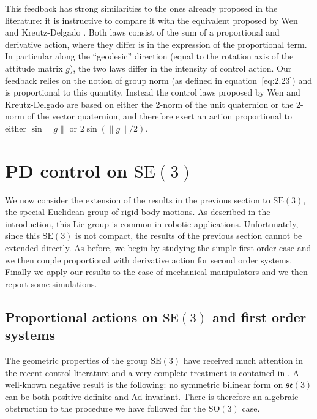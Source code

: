 \documentclass[11pt]{article}
\newcommand{\SO}{\mathrm{SO}}
\newcommand{\SE}{\mathrm{SE}}
\newcommand{\se}{\mathfrak{se}}
\begin{document}
This feedback has strong similarities to the ones already proposed in the literature: it is instructive to compare it with the equivalent proposed by Wen and Kreutz-Delgado \cite{34}. Both laws consist of the sum of a proportional and derivative action, where they differ is in the expression of the proportional term. In particular along the ``geodesic'' direction (equal to the rotation axis of the attitude matrix $g$), the two laws differ in the intensity of control action. Our feedback relies on the notion of group norm (as defined in equation~\eqref{eq:2.23}) and is proportional to this quantity. Instead the control laws proposed by Wen and Kreutz-Delgado are based on either the 2-norm of the unit quaternion or the 2-norm of the vector quaternion, and therefore exert an action proportional to either $\sin\|g\|$ or $2\sin(\|g\|/2)$.

\section{PD control on $\SE(3)$}\label{sec:pd-se3}
We now consider the extension of the results in the previous section to $\SE(3)$, the special Euclidean group of rigid-body motions. As described in the introduction, this Lie group is common in robotic applications. Unfortunately, since this $\SE(3)$ is not compact, the results of the previous section cannot be extended directly. As before, we begin by studying the simple first order case and we then couple proportional with derivative action for second order systems. Finally we apply our results to the case of mechanical manipulators and we then report some simulations.

\subsection{Proportional actions on $\SE(3)$ and first order systems}\label{subsec:proportional-se3}
The geometric properties of the group $\SE(3)$ have received much attention in the recent control literature \cite{7,26} and a very complete treatment is contained in \cite{28}. A well-known negative result is the following: no symmetric bilinear form on $\se(3)$ can be both positive-definite and Ad-invariant. There is therefore an algebraic obstruction to the procedure we have followed for the $\SO(3)$ case.
\end{document}
